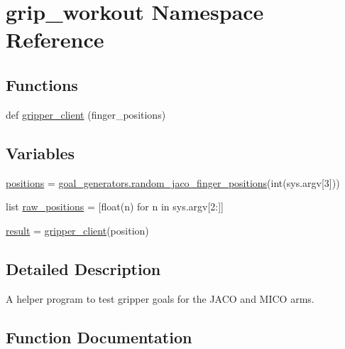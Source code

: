 \hypertarget{namespacegrip__workout}{}\section{grip\+\_\+workout Namespace Reference}
\label{namespacegrip__workout}
\subsection*{Functions}
\begin{DoxyCompactItemize}
\item 
def \hyperlink{namespacegrip__workout_a5c14bb069a6ceb0f3854520cc298a2c1}{gripper\+\_\+client} (finger\+\_\+positions)
\end{DoxyCompactItemize}
\subsection*{Variables}
\begin{DoxyCompactItemize}
\item 
\hyperlink{namespacegrip__workout_a3deafc04ebe19165cfdc795ba4f53692}{positions} = \hyperlink{namespacegoal__generators_a2b395bfee98a60349c6a7193e8d3059f}{goal\+\_\+generators.\+random\+\_\+jaco\+\_\+finger\+\_\+positions}(int(sys.\+argv\mbox{[}3\mbox{]}))
\item 
list \hyperlink{namespacegrip__workout_a2e28cab9dcd884944ac12b695ad4a773}{raw\+\_\+positions} = \mbox{[}float(n) for n in sys.\+argv\mbox{[}2\+:\mbox{]}\mbox{]}
\item 
\hyperlink{namespacegrip__workout_ac8e857bea751845a9f8c3f34d4fa3399}{result} = \hyperlink{namespacegrip__workout_a5c14bb069a6ceb0f3854520cc298a2c1}{gripper\+\_\+client}(position)
\end{DoxyCompactItemize}


\subsection{Detailed Description}
\begin{DoxyVerb}A helper program to test gripper goals for the JACO and MICO arms.\end{DoxyVerb}
 

\subsection{Function Documentation}
